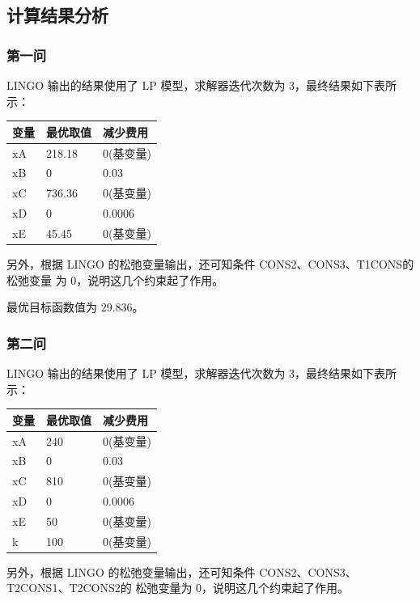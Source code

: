 \documentclass{article}
\begin{document}
\subsection{计算结果分析}
\subsubsection{第一问}
LINGO 输出的结果使用了 LP 模型，求解器迭代次数为 3，最终结果如下表所示：
\begin{table}[H]
\centering
\begin{tabular}{|l|l|l|}
\hline
变量 & 最优取值   & 减少费用   \\ \hline
xA & 218.18 & 0(基变量) \\ \hline
xB & 0      & 0.03   \\ \hline
xC & 736.36 & 0(基变量) \\ \hline
xD & 0      & 0.0006 \\ \hline
xE & 45.45  & 0(基变量) \\ \hline
\end{tabular}
\end{table}

另外，根据 LINGO 的松弛变量输出，还可知条件 CONS2、CONS3、T1CONS的松弛变量 为 0，说明这几个约束起了作用。

最优目标函数值为 29.836。

\subsubsection{第二问}

LINGO 输出的结果使用了 LP 模型，求解器迭代次数为 3，最终结果如下表所示：

\begin{table}[H]
\centering
\begin{tabular}{|l|l|l|}
\hline
变量 & 最优取值   & 减少费用   \\ \hline
xA & 240 & 0(基变量) \\ \hline
xB & 0      & 0.03   \\ \hline
xC & 810 & 0(基变量) \\ \hline
xD & 0      & 0.0006 \\ \hline
xE & 50  & 0(基变量) \\ \hline
k  & 100    & 0(基变量) \\ \hline
\end{tabular}
\end{table}


另外，根据 LINGO 的松弛变量输出，还可知条件 CONS2、CONS3、T2CONS1、T2CONS2的 松弛变量为 0，说明这几个约束起了作用。
\end{document}
